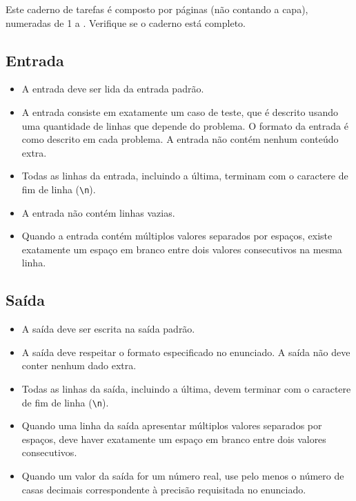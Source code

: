 Este caderno de tarefas é composto por \pageref*{lastpage} páginas (não
contando a capa), numeradas 
de 1 a \pageref*{lastpage}. Verifique se o caderno está completo.

\subsection*{Entrada}

\begin{itemize}
	\item A entrada deve ser lida da entrada padrão.

	\item A entrada consiste em exatamente um caso de teste, que é descrito usando uma
	quantidade de linhas que depende do problema. O formato da entrada é como descrito
	em cada problema. A entrada não contém nenhum conteúdo extra.

	\item Todas as linhas da entrada, incluindo a última, terminam com o caractere de fim
	de linha (\texttt{\textbackslash n}).

	\item A entrada não contém linhas vazias.

	\item Quando a entrada contém múltiplos valores separados por espaços, 
	existe exatamente um espaço em branco entre dois valores consecutivos na mesma linha.
\end{itemize}

\subsection*{Saída}

\begin{itemize}
	\item A saída deve ser escrita na saída padrão.

	\item A saída deve respeitar o formato especificado no enunciado. A saída não deve
	conter nenhum dado extra.

	\item Todas as linhas da saída, incluindo a última, devem terminar com o caractere de fim
	de linha (\texttt{\textbackslash n}).

	\item Quando uma linha da saída apresentar múltiplos valores separados por espaços, deve haver
	exatamente um espaço em branco entre dois valores consecutivos.

	\item Quando um valor da saída for um número real, use pelo menos o número de casas decimais correspondente
	à precisão requisitada no enunciado.
\end{itemize}

